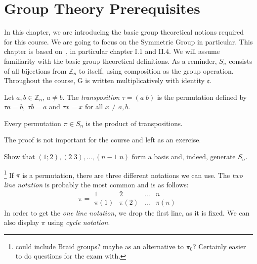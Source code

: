 \chapter{Group Theory Prerequisites}

In this chapter, we are introducing the basic group theoretical notions required for this course.
We are going to focus on the Symmetric Group in particular.
This chapter is based on~\cite{Grillet}, in particular chapter I.1 and II.4.
We will assume familiarity with the basic group theoretical definitions.
As a reminder, $S_n$ consists of all bijections from $\mathbb{Z}_n$ to itself, using composition as the group operation.
Throughout the course, G is written multiplicatively with identity $\mathfrak{e}$.
\begin{definition}
Let $a,b\in\mathbb{Z}_n$, $a\neq b$.
The \emph{transposition} $\tau=(a\;b)$ is the permutation defined by $\tau a=b,\;\tau b=a$ and $\tau x=x$ for all $x\neq a,b$.
\end{definition}
\begin{proposition}
Every permutation $\pi\in S_n$ is the product of transpositions.
\end{proposition}
The proof is not important for the course and left as an exercise.
\begin{exercise}
Show that $(1;2),(2\;3),\ldots,(n-1\;n)$ form a basis and, indeed, generate $S_n$.
\end{exercise}
\footnote{could include Braid groups? maybe as an alternative to $\pi_0$? Certainly easier to do questions for the exam with.}
If $\pi$ is a permutation, there are three different notations we can use.
The \emph{two line notation} is probably the most common and is as follows:
\begin{equation*}
\pi=
\begin{array}{cccc}
1&2&\ldots &n\\
\pi(1)&\pi(2)&\ldots&\pi(n)
\end{array}
\end{equation*}
In order to get the \emph{one line notation}, we drop the first line, as it is fixed.
We can also display $\pi$ using \emph{cycle notation}.